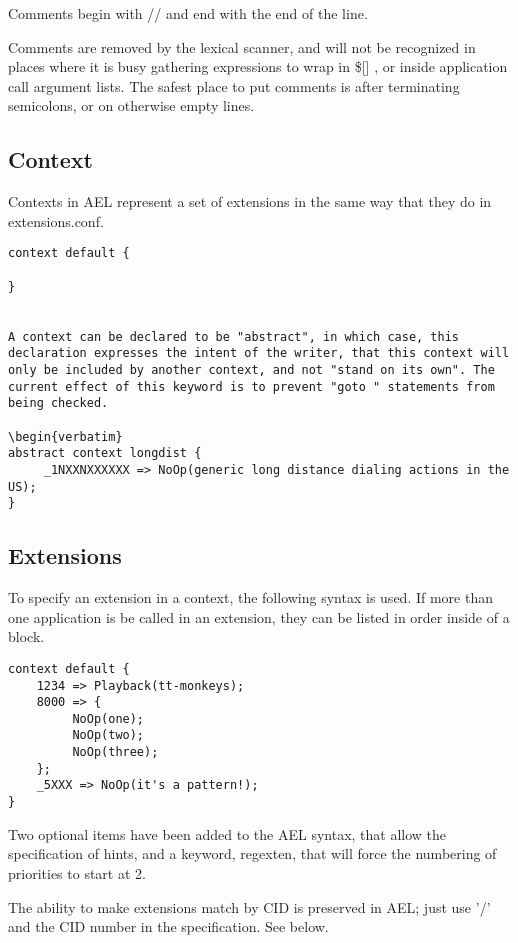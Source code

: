 {Comments begin with // and end with the end of the line.

Comments are removed by the lexical scanner, and will not be
recognized in places where it is busy gathering expressions to wrap in
\$[] , or inside application call argument lists. The safest place to put
comments is after terminating semicolons, or on otherwise empty lines.


\subsection{Context}

Contexts in AEL represent a set of extensions in the same way that
they do in extensions.conf.

\begin{verbatim}
context default {

}


A context can be declared to be "abstract", in which case, this
declaration expresses the intent of the writer, that this context will
only be included by another context, and not "stand on its own". The
current effect of this keyword is to prevent "goto " statements from
being checked.

\begin{verbatim}
abstract context longdist {
     _1NXXNXXXXXX => NoOp(generic long distance dialing actions in the US);
}
\end{verbatim}


\subsection{Extensions}

To specify an extension in a context, the following syntax is used. If
more than one application is be called in an extension, they can be
listed in order inside of a block.

\begin{verbatim}
context default {
    1234 => Playback(tt-monkeys);
    8000 => {
         NoOp(one);
         NoOp(two);
         NoOp(three);
    };
    _5XXX => NoOp(it's a pattern!);
}
\end{verbatim}

Two optional items have been added to the AEL syntax, that allow the
specification of hints, and a keyword, regexten, that will force the
numbering of priorities to start at 2.

The ability to make extensions match by CID is preserved in
AEL; just use '/' and the CID number in the specification. See below.

}
